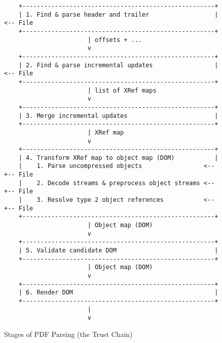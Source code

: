 \begin{figure}[t]
  \centering
  \begin{lstlisting}
    +-----------------------------------------------------+
    | 1. Find & parse header and trailer                  |<-- File
    +-----------------------------------------------------+
                       | offsets + ...
                       v
    +-----------------------------------------------------+
    | 2. Find & parse incremental updates                 |<-- File
    +-----------------------------------------------------+
                       | list of XRef maps
                       v
    +-----------------------------------------------------+
    | 3. Merge incremental updates                        |
    +-----------------------------------------------------+
                       | XRef map
                       v
    +-----------------------------------------------------+
    | 4. Transform XRef map to object map (DOM)           |
    |    1. Parse uncompressed objects                 <--+-- File
    |    2. Decode streams & preprocess object streams <--+-- File
    |    3. Resolve type 2 object references           <--+-- File
    +-----------------------------------------------------+
                       | Object map (DOM)
                       v
    +-----------------------------------------------------+
    | 5. Validate candidate DOM                           |
    +-----------------------------------------------------+
                       | Object map (DOM)                                    
                       v
    +-----------------------------------------------------+
    | 6. Render DOM                                       |
    +-----------------------------------------------------+
                       | 
                       v
  \end{lstlisting}
  \caption{Stages of PDF Parsing (the Trust Chain)}
  \label{fig:pdf-trust-chain}
\end{figure}

